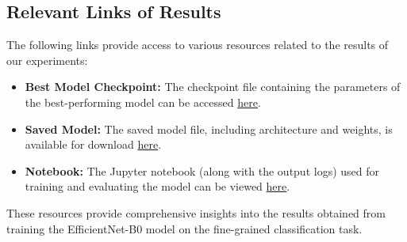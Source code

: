 \documentclass[12pt, a4paper, twoside]{article}
\begin{document}
		\subsection{Relevant Links of Results}
			The following links provide access to various resources related to the results of our experiments:
			
			\begin{itemize}
				\item \textbf{Best Model Checkpoint:} The checkpoint file containing the parameters of the best-performing model can be accessed \href{https://drive.google.com/file/d/1JsOzW7WrnykJMZOLyPGVy99H9asHi9F_/view?usp=sharing}{here}.
				
				\item \textbf{Saved Model:} The saved model file, including architecture and weights, is available for download \href{https://drive.google.com/file/d/1UNvh-J8eNzW6rZf0gW-Op9O9E8TtiXjx/view?usp=sharing}{here}.
				
				\item \textbf{Notebook:} The Jupyter notebook (along with the output logs) used for training and evaluating the model can be viewed \href{https://drive.google.com/file/d/1IqrIAbkBG-xe7R9-25Du9wCmyD377iFA/view?usp=sharing}{here}.

			\end{itemize}
			
			These resources provide comprehensive insights into the results obtained from training the EfficientNet-B0 model on the fine-grained classification task.
			
\end{document}
